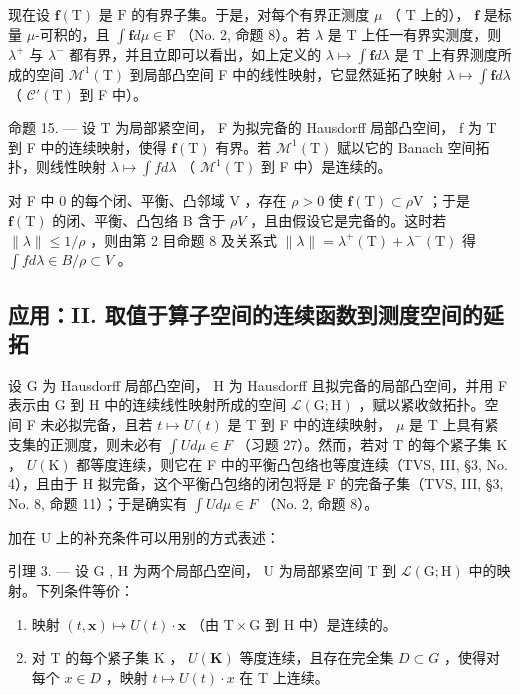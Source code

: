 现在设 \(\mathbf{f}(\mathrm{T})\) 是 \(\mathrm{F}\) 的有界子集。于是，对每个有界正测度 \(\mu\) （ \(\mathrm{T}\) 上的）， \(\mathbf{f}\) 是标量 \(\mu\)-可积的，且 \(\int \mathbf{f}d\mu \in \mathrm{F}\) （No. 2, 命题 8）。若 \(\lambda\) 是 T 上任一有界实测度，则 \(\lambda^{+}\) 与 \(\lambda^{-}\) 都有界，并且立即可以看出，如上定义的 \(\lambda \mapsto \int \mathbf{f} d\lambda\) 是 T 上有界测度所成的空间 \(\mathcal{M}^1(\mathrm{T})\) 到局部凸空间 F 中的线性映射，它显然延拓了映射 \(\lambda \mapsto \int \mathbf{f} d\lambda\) （ \(\mathcal{C}'(\mathrm{T})\) 到 F 中）。

命题 15. --- 设 T 为局部紧空间， F 为拟完备的 Hausdorff 局部凸空间， f 为 T 到 F 中的连续映射，使得 \(\mathbf{f}(\mathrm{T})\) 有界。若 \(\mathcal{M}^{1}(\mathrm{T})\) 赋以它的 Banach 空间拓扑，则线性映射 \(\lambda \mapsto \int f d\lambda\) （ \(\mathcal{M}^{1}(\mathrm{T})\) 到 F 中）是连续的。

对 F 中 0 的每个闭、平衡、凸邻域 V ，存在 \(\rho > 0\) 使 \(\mathbf{f}(\mathrm{T}) \subset \rho\mathrm{V}\) ；于是 \(\mathbf{f}(\mathrm{T})\) 的闭、平衡、凸包络 B 含于 \(\rho V\) ，且由假设它是完备的。这时若 \(\|\lambda\| \leqslant 1/\rho\) ，则由第 2 目命题 8 及关系式 \(\|\lambda\| = \lambda^{+}(\mathrm{T}) + \lambda^{-}(\mathrm{T})\) 得 \(\int f d\lambda \in B/\rho \subset V\) 。

\subsection{应用：II. 取值于算子空间的连续函数到测度空间的延拓}

设 G 为 Hausdorff 局部凸空间， H 为 Hausdorff 且拟完备的局部凸空间，并用 F 表示由 G 到 H 中的连续线性映射所成的空间 \(\mathcal{L}(\mathrm{G};\mathrm{H})\) ，赋以紧收敛拓扑。空间 F 未必拟完备，且若 \(t \mapsto U(t)\) 是 T 到 F 中的连续映射， \(\mu\) 是 T 上具有紧支集的正测度，则未必有 \(\int U d\mu \in F\) （习题 27）。然而，若对 T 的每个紧子集 K ， \(U(\mathrm{K})\) 都等度连续，则它在 F 中的平衡凸包络也等度连续（TVS, III, §3, No. 4），且由于 H 拟完备，这个平衡凸包络的闭包将是 F 的完备子集（TVS, III, §3, No. 8, 命题 11）；于是确实有 \(\int U d\mu \in F\) （No. 2, 命题 8）。

加在 U 上的补充条件可以用别的方式表述：

引理 3. --- 设 G , H 为两个局部凸空间， U 为局部紧空间 T 到 \(\mathcal{L}(\mathrm{G};\mathrm{H})\) 中的映射。下列条件等价：

\begin{enumerate}
\def\labelenumi{\alph{enumi})}
\item
  映射 \((t,\mathbf{x})\mapsto U(t)\cdot \mathbf{x}\) （由 \(\mathrm{T}\times \mathrm{G}\) 到 H 中）是连续的。
\item
  对 T 的每个紧子集 K ， \(U(\mathbf{K})\) 等度连续，且存在完全集 \(D \subset G\) ，使得对每个 \(x \in D\) ，映射 \(t \mapsto U(t) \cdot x\) 在 T 上连续。
\end{enumerate}

